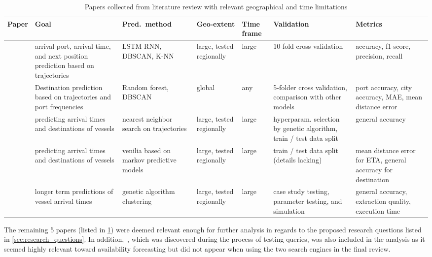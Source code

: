\begin{table}[htbp]
    \centering
    {\small
    \begin{tabular}{p{0.6in} p{0.8in} p{0.75in} p{0.6in} p{0.4in} p{0.8in} p{0.7in}}
    \hline
    \bfseries{Paper} & \bfseries{Goal} & \bfseries{Pred.\ method} & \bfseries{Geo-extent} & \bfseries{Time frame} & \bfseries{Validation} & \bfseries{Metrics} \\ \hline
        \cite{Karatas2020TrajectoryData} & arrival port, arrival time, and next position prediction based on trajectories & LSTM RNN, DBSCAN, K-NN & large, tested regionally & large & 10-fold cross validation & accuracy, f1-score, precision, recall \\ \hline
        \cite{Zhang2020AISApproach} & Destination prediction based on trajectories and port frequencies & Random forest, DBSCAN & global & any & 5-folder cross validation, comparison with other models & port accuracy, city accuracy, MAE, mean distance error \\ \hline
        \cite{Rosca2018GrandRoutes} & predicting arrival times and destinations of vessels & nearest neighbor search on trajectories & large, tested regionally & large & hyperparam. selection by genetic algorithm, train / test data split & general accuracy \\ \hline
        \cite{Bachar2018GrandDestination} & predicting arrival times and destinations of vessels & venilia based on markov predictive models & large, tested regionally & large & train / test data split (details lacking) & mean distance error for ETA, general accuracy for destination \\ \hline
        \cite{Dobrkovic2018MaritimeData} & longer term predictions of vessel arrival times & genetic algorithm clustering & large, tested regionally & large & case study testing, parameter testing, and simulation & general accuracy, extraction quality, execution time \\ \hline
    \end{tabular}
    }
\caption{Papers collected from literature review with relevant geographical and time limitations}\label{tab:most_relevant_papers}
\end{table}

The remaining \textbf{}5 papers (listed in \cref{tab:most_relevant_papers}) were deemed relevant enough for further analysis in regards to the proposed research questions listed in \cref{sec:research_questions}. In addition,~\cite{lechtenberg2019}, which was discovered during the process of testing queries, was also included in the analysis as it seemed highly relevant toward availability forecasting but did not appear when using the two search engines in the final review.

